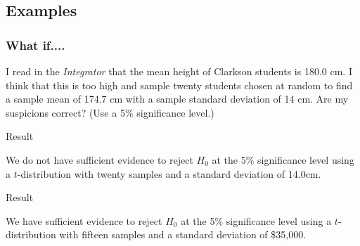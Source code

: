 \subsection{Examples}

\begin{frame}
  \frametitle{What if....}


  I read in the \textit{Integrator} that the mean height of Clarkson
  students is 180.0 cm. I think that this is too high and sample
  twenty students chosen at random to find a sample mean of 174.7 cm
  with a {\color{red}sample} standard deviation of 14 cm. Are my
  suspicions correct?  (Use a 5\% significance level.)

    \vfill
    

\end{frame}


\begin{frame}{Result}

  We do not have sufficient evidence to reject $H_0$ at the 5\%
  significance level using a $t$-distribution with twenty samples and
  a standard deviation of 14.0cm.
  
\end{frame}






\begin{frame}{Result}

  We have sufficient evidence to reject $H_0$ at the 5\% significance
  level using a $t$-distribution with fifteen samples and a standard
  deviation of \$35,000.
  
\end{frame}


